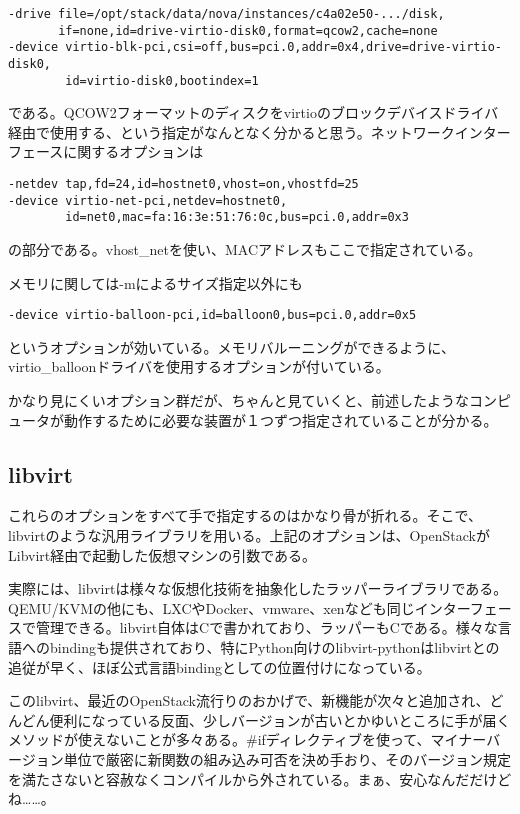 \documentclass[9pt,b5paper,tombo]{jsbook}
\begin{document}
\begin{lstlisting}
-drive file=/opt/stack/data/nova/instances/c4a02e50-.../disk,
       if=none,id=drive-virtio-disk0,format=qcow2,cache=none
-device virtio-blk-pci,csi=off,bus=pci.0,addr=0x4,drive=drive-virtio-disk0,
        id=virtio-disk0,bootindex=1
\end{lstlisting}

である。QCOW2フォーマットのディスクをvirtioのブロックデバイスドライバ経由で使用する、という指定がなんとなく分かると思う。ネットワークインターフェースに関するオプションは

\begin{lstlisting}
-netdev tap,fd=24,id=hostnet0,vhost=on,vhostfd=25
-device virtio-net-pci,netdev=hostnet0,
        id=net0,mac=fa:16:3e:51:76:0c,bus=pci.0,addr=0x3
\end{lstlisting}

の部分である。vhost\_netを使い、MACアドレスもここで指定されている。

メモリに関しては-mによるサイズ指定以外にも

\begin{lstlisting}
-device virtio-balloon-pci,id=balloon0,bus=pci.0,addr=0x5
\end{lstlisting}

というオプションが効いている。メモリバルーニングができるように、virtio\_balloonドライバを使用するオプションが付いている。

かなり見にくいオプション群だが、ちゃんと見ていくと、前述したようなコンピュータが動作するために必要な装置が１つずつ指定されていることが分かる。

\subsection{libvirt}

これらのオプションをすべて手で指定するのはかなり骨が折れる。そこで、libvirtのような汎用ライブラリを用いる。上記のオプションは、OpenStackがLibvirt経由で起動した仮想マシンの引数である。

実際には、libvirtは様々な仮想化技術を抽象化したラッパーライブラリである。QEMU/KVMの他にも、LXCやDocker、vmware、xenなども同じインターフェースで管理できる。libvirt自体はCで書かれており、ラッパーもCである。様々な言語へのbindingも提供されており、特にPython向けのlibvirt-pythonはlibvirtとの追従が早く、ほぼ公式言語bindingとしての位置付けになっている。

このlibvirt、最近のOpenStack流行りのおかげで、新機能が次々と追加され、どんどん便利になっている反面、少しバージョンが古いとかゆいところに手が届くメソッドが使えないことが多々ある。\#ifディレクティブを使って、マイナーバージョン単位で厳密に新関数の組み込み可否を決め手おり、そのバージョン規定を満たさないと容赦なくコンパイルから外されている。まぁ、安心なんだだけどね……。
\end{document}
